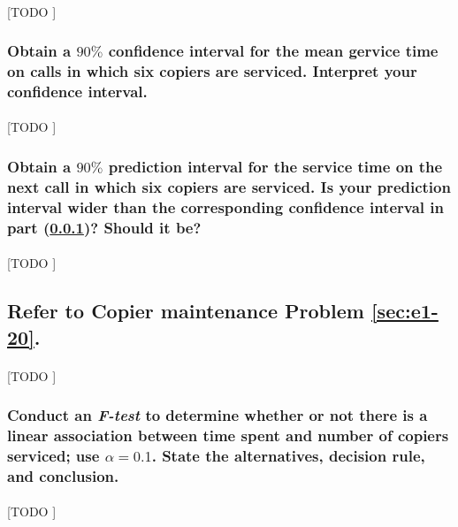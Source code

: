 \documentclass{article}
\begin{document}
      \paragraph{}
      [TODO ]

      \subsubsection{Obtain a $90\%$ confidence interval for the mean gervice time on calls in which six copiers are serviced. Interpret your confidence interval.}
      \label{sec:copiers-2.14a}

        \paragraph{}
        [TODO ]

      \subsubsection{Obtain a $90\%$ prediction interval for the service time on the next call in which six copiers are serviced. Is your prediction interval wider than the corresponding confidence interval in part (\ref{sec:copiers-2.14a})? Should it be?}

        \paragraph{}
        [TODO ]

    \setcounter{subsection}{23}
    \subsection{Refer to \textbf{Copier maintenance} Problem \ref{sec:e1-20}.}


      \paragraph{}
      [TODO ]

      \setcounter{subsubsection}{1}
      \subsubsection{Conduct an \emph{F-test} to determine whether or not there is a linear association between time spent and number of copiers serviced; use $\alpha = 0.1$. State the alternatives, decision rule, and conclusion.}

        \paragraph{}
        [TODO ]
\end{document}
